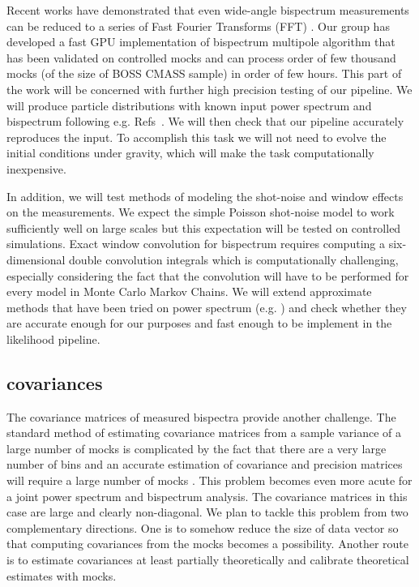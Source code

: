 Recent works have demonstrated that even wide-angle bispectrum measurements can
be reduced to a series of Fast Fourier Transforms (FFT)
\cite{2015PhRvD..92h3532S,2018arXiv180302132S}. Our group has developed a fast
GPU implementation of bispectrum multipole algorithm that has been validated on
controlled mocks and can process order of few thousand mocks (of the size of
BOSS CMASS sample) in order of few hours. This part of the work will be
concerned with further high precision testing of our pipeline. We will produce
particle distributions with known input power spectrum and bispectrum following
e.g. Refs~\cite{2012PhRvD..85h3002S,2012PhRvD..86l3524R,2010JCAP...10..022W}.
We will then check that our pipeline accurately reproduces the input. To
accomplish this task we will not need to evolve the initial conditions under
gravity, which will make the task computationally inexpensive. 

In addition, we will test methods of modeling the shot-noise and window effects
on the measurements. We expect the simple Poisson shot-noise model to work
sufficiently well on large scales but this expectation will be tested on
controlled simulations. Exact window convolution for bispectrum requires
computing a six-dimensional double convolution integrals which is
computationally challenging, especially considering the fact that the
convolution will have to be performed for every model in Monte Carlo Markov
Chains. We will extend approximate methods that have been tried on power
spectrum (e.g. \cite{2017MNRAS.464.3121W}) and check whether they are accurate
enough for our purposes and fast enough to be implement in the likelihood
pipeline. 

\subsection*{covariances}

The covariance matrices of measured bispectra provide another challenge. The
standard method of estimating covariance matrices from a sample variance of a
large number of mocks is complicated by the fact that there are a very large
number of bins and an accurate estimation of covariance and precision matrices
will require a large number of mocks
\cite{2006MNRAS.371.1188H,2007A&A...464..399H,2013MNRAS.432.1928T,2013PhRvD..88f3537D,2014MNRAS.439.2531P,2014MNRAS.442.2728T}.
This problem becomes even more acute for a joint power spectrum and bispectrum
analysis. The covariance matrices in this case are large and clearly
non-diagonal.  We plan to tackle this problem from two complementary
directions. One is to somehow reduce the size of data vector so that computing
covariances from the mocks becomes a possibility. Another route is to estimate
covariances at least partially theoretically and calibrate theoretical
estimates with mocks. 

